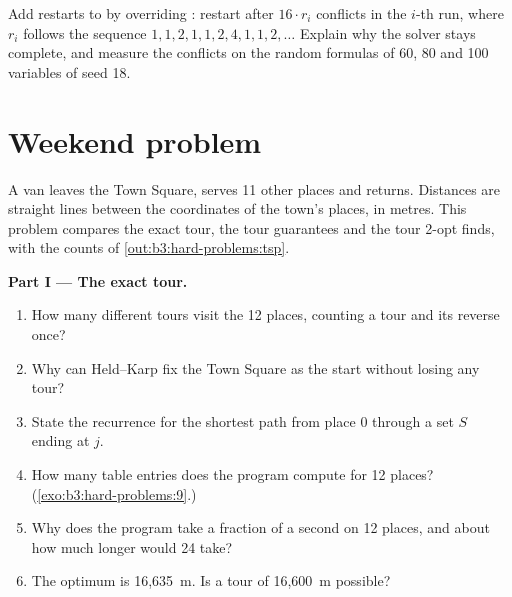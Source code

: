 \begin{exercise}[$\star\star\star$]\label{exo:b3:hard-problems:12}
Add restarts to  by overriding : restart after $16 \cdot r_i$ conflicts in the $i$-th run, where $r_i$ follows the sequence $1, 1, 2, 1, 1, 2, 4, 1, 1, 2, \ldots$ Explain why the solver stays complete, and measure the conflicts on the random formulas of 60, 80 and 100 variables of seed 18.
\end{exercise}

\section{Weekend problem}\label{sec:b3:hard-problems:problem}

\begin{problem}\label{pb:b3:hard-problems:1}
A van leaves the Town Square, serves 11 other places and returns. Distances are straight lines between the coordinates of the town's places, in metres. This problem compares the exact tour, the tour  guarantees and the tour 2-opt finds, with the counts of \cref{out:b3:hard-problems:tsp}.

\medskip\noindent\textbf{Part I --- The exact tour.}
\begin{enumerate}
  \item How many different tours visit the 12 places, counting a tour and its reverse once?
  \item Why can Held--Karp fix the Town Square as the start without losing any tour?
  \item State the recurrence for the shortest path from place 0 through a set $S$ ending at $j$.
  \item How many table entries does the program compute for 12 places? (\cref{exo:b3:hard-problems:9}.)
  \item Why does the program take a fraction of a second on 12 places, and about how much longer would 24 take?
  \item The optimum is 16,635~m. Is a tour of 16,600~m possible?
\end{enumerate}


\end{problem}
